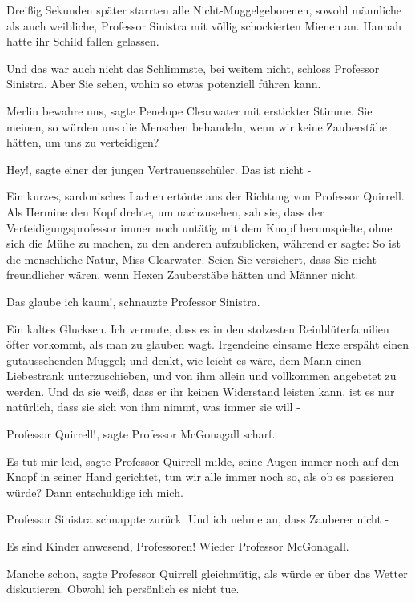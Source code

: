 Dreißig Sekunden später starrten alle Nicht-Muggelgeborenen, sowohl männliche
als auch weibliche, Professor Sinistra mit völlig schockierten Mienen an. Hannah
hatte ihr Schild fallen gelassen.

\glqq Und das war auch nicht das Schlimmste, bei weitem nicht\grqq{}, schloss
Professor Sinistra. \glqq Aber Sie sehen, wohin so etwas potenziell führen
kann.\grqq{}

\glqq Merlin bewahre uns\grqq{}, sagte Penelope Clearwater mit erstickter
Stimme. \glqq Sie meinen, so würden uns die Menschen behandeln, wenn wir keine
Zauberstäbe hätten, um uns zu verteidigen?\grqq{}

\glqq Hey!\grqq{}, sagte einer der jungen Vertrauensschüler. \glqq Das ist nicht
-\grqq{}

Ein kurzes, sardonisches Lachen ertönte aus der Richtung von Professor Quirrell.
Als Hermine den Kopf drehte, um nachzusehen, sah sie, dass der
Verteidigungsprofessor immer noch untätig mit dem Knopf herumspielte, ohne sich
die Mühe zu machen, zu den anderen aufzublicken, während er sagte: \glqq So ist
die menschliche Natur, Miss Clearwater. Seien Sie versichert, dass Sie nicht
freundlicher wären, wenn Hexen Zauberstäbe hätten und Männer nicht.\grqq{}

\glqq Das glaube ich kaum!\grqq{}, schnauzte Professor Sinistra.

Ein kaltes Glucksen. \glqq Ich vermute, dass es in den stolzesten
Reinblüterfamilien öfter vorkommt, als man zu glauben wagt. Irgendeine einsame
Hexe erspäht einen gutaussehenden Muggel; und denkt, wie leicht es wäre, dem
Mann einen Liebestrank unterzuschieben, und von ihm allein und vollkommen
angebetet zu werden. Und da sie weiß, dass er ihr keinen Widerstand leisten
kann, ist es nur natürlich, dass sie sich von ihm nimmt, was immer sie will
-\grqq{}

\glqq Professor Quirrell!\grqq{}, sagte Professor McGonagall scharf.

\glqq Es tut mir leid\grqq{}, sagte Professor Quirrell milde, seine Augen immer
noch auf den Knopf in seiner Hand gerichtet, \glqq tun wir alle immer noch so,
als ob es passieren würde? Dann entschuldige ich mich.\grqq{}

Professor Sinistra schnappte zurück: \glqq Und ich nehme an, dass Zauberer nicht
-\grqq{}

\glqq Es sind Kinder anwesend, Professoren!\grqq{} Wieder Professor McGonagall.

\glqq Manche schon\grqq{}, sagte Professor Quirrell gleichmütig, als würde er
über das Wetter diskutieren. \glqq Obwohl ich persönlich es nicht tue.\grqq{}

